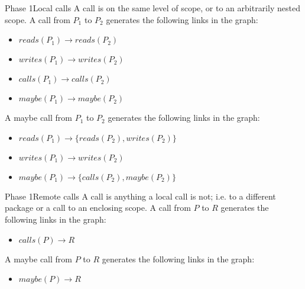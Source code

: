 \documentclass{beamer}
\begin{document}
\begin{frame}{Phase 1}{Local calls}
  A  call is on the same level of scope, or to an
  arbitrarily nested scope. A call from $P_1$ to $P_2$ generates the
  following links in the graph:
  \begin{itemize}
  \item $reads(P_1) \rightarrow reads(P_2)$
  \item $writes(P_1) \rightarrow writes(P_2)$
  \item $calls(P_1) \rightarrow calls(P_2)$
  \item $maybe(P_1) \rightarrow maybe(P_2)$
  \end{itemize}

  A  maybe call from $P_1$ to $P_2$ generates the
  following links in the graph:
  \begin{itemize}
  \item $reads(P_1) \rightarrow \{reads(P_2), writes(P_2)\}$
  \item $writes(P_1) \rightarrow writes(P_2)$
  \item $maybe(P_1) \rightarrow \{calls(P_2), maybe(P_2)\}$
  \end{itemize}
\end{frame}

\begin{frame}{Phase 1}{Remote calls}
  A  call is anything a local call is not; i.e. to a
  different package or a call to an enclosing scope. A call from $P$ to $R$
  generates the following links in the graph:
  \begin{itemize}
  \item $calls(P) \rightarrow R$
  \end{itemize}

  A  maybe call from $P$ to $R$ generates the following
  links in the graph:
  \begin{itemize}
  \item $maybe(P) \rightarrow R$
  \end{itemize}
\end{frame}
\end{document}

